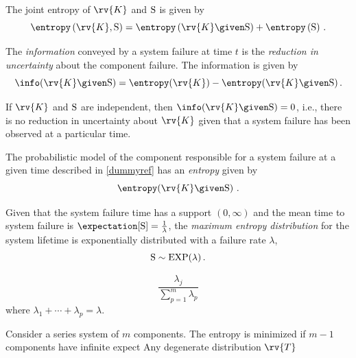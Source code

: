 \documentclass[../main.tex]{subfiles}
\begin{document}
The joint entropy of $\rv{K}$ and $\mathrm{S}$ is given by
\begin{equation}
    \entropy\left(\rv{K}, \sv\right) = \entropy\left(\rv{K} \given \sv\right) + \entropy\left(\sv\right)\,.
\end{equation}

The \emph{information} conveyed by a system failure at time $t$ is the \emph{reduction in uncertainty} about the component failure. The information is given by
\begin{equation}
    \info(\rv{K} \given \sv) = \entropy(\rv{K}) - \entropy(\rv{K} \given \sv)\,.
\end{equation}

If $\rv{K}$ and $\mathrm{S}$ are independent, then $\info(\rv{K} \given \sv) = 0$, i.e., there is no reduction in uncertainty about $\rv{K}$ given that a system failure has been observed at a particular time.

The probabilistic model of the component responsible for a system failure at a 
given time described in \cref{dummyref} has an \emph{entropy} given by
\begin{equation}
    \entropy\!\left(\rv{K} \given \sv\right)\,.
\end{equation}

Given that the system failure time has a support $(0,\infty)$ and the mean time to system failure is $\expectation[\sv] = \frac{1}{\lambda}$, the \emph{maximum entropy distribution} for the system lifetime is exponentially distributed with a failure rate $\lambda$,
\begin{equation}
    \mathrm{S} \sim \mathrm{EXP}(\lambda)\,.
\end{equation}


\begin{equation}
    \frac{\lambda_j}{\sum_{p=1}^{m} \lambda_p}
\end{equation}
where $\lambda_1 + \cdots + \lambda_p = \lambda$.











Consider a series system of $m$ components. The entropy is minimized if $m-1$ components have infinite expect
Any degenerate distribution $\rv{T}$
\end{document}
